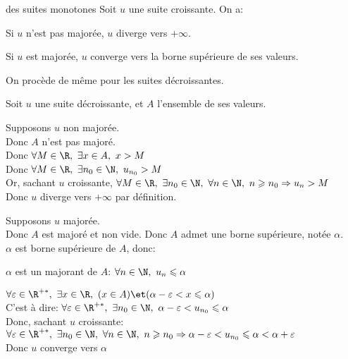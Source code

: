 \documentclass[12pt,twoside,a4paper]{article}
\author{MPSI 2}
\begin{document}
	\maketitle
	\begin{theo}{des suites monotones}
		Soit $u$ une suite croissante. On a:
		\begin{liste}
			\item Si $u$ n'est pas major\'ee, $u$ diverge vers $+\infty$.
			\item Si $u$ est major\'ee, $u$ converge vers la borne sup\'erieure de ses valeurs.
		\end{liste}
		On proc\`ede de m\^eme pour les suites d\'ecroissantes.
	\end{theo}
	\begin{preuve}
		Soit $u$ une suite d\'ecroissante, et $A$ l'ensemble de ses valeurs.
		\begin{liste}
			\item[\cercle1]Supposons $u$ non major\'ee.\\
				Donc $A$ n'est pas major\'e.\\
				Donc $\forall M\in\R,\ \exists x\in A,\ x>M$\\
				Donc $\forall M\in\R,\ \exists n_0\in \N,\ u_{n_0}>M$\\
				Or, sachant $u$ croissante, $\forall M\in\R,\ \exists n_0\in \N,\ \forall n\in\N,\ n\geqslant n_0\Rightarrow u_n>M$\\
				Donc $u$ diverge vers $+\infty$ par d\'efinition.
			\item[\cercle2]Supposons $u$ major\'ee.\\
				Donc $A$ est major\'e et non vide. Donc $A$ admet une borne sup\'erieure, not\'ee $\alpha$.\\
				$\alpha$ est borne sup\'erieure de $A$, donc:
				\begin{liste}
					\item $\alpha$ est un majorant de $A$: $\forall n\in\N,\ u_n\leqslant\alpha$
					\item $\forall \varepsilon\in\R^{+*},\ \exists x\in\R,\ (x\in A)\et(\alpha-\varepsilon<x\leqslant\alpha)$\\
						C'est \`a dire: $\forall \varepsilon\in\R^{+*},\ \exists n_0\in\N,\ \alpha-\varepsilon<u_{n_0}\leqslant\alpha$\\
						Donc, sachant $u$ croissante:\\
						$\forall \varepsilon\in\R^{+*},\ \exists n_0\in\N,\ \forall n\in\N,\ n\geqslant n_0\Rightarrow\alpha-\varepsilon<u_{n_0}\leqslant\alpha<\alpha+\varepsilon$\\
						Donc $u$ converge vers $\alpha$
				\end{liste}
		\end{liste}
	\end{preuve}
\end{document}
